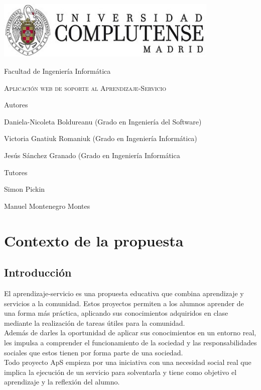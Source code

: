 \documentclass{article}
\begin{document}
\begin{titlepage}
	\centering
	{\includegraphics[width=0.8\textwidth]{logo}\par}
	\vspace{1cm}
	{\Large Facultad de Ingeniería Informática \par}
	\vspace{3cm}
	{\scshape\Huge Aplicación web de soporte al Aprendizaje-Servicio \par}
	\vspace{5cm}
	{\textbf\Large Autores \par}
	{\Large Daniela-Nicoleta Boldureanu (Grado en Ingeniería del Software)\par}
	{\Large Victoria Gnatiuk Romaniuk (Grado en Ingeniería Informática)\par}
	{\Large Jesús Sánchez Granado (Grado en Ingeniería Informática\par}
	\vspace{1cm}
	{\textbf\Large Tutores \par}
	{\Large Simon Pickin \par}
	{\Large Manuel Montenegro Montes \par}
	
\end{titlepage}

\tableofcontents
\newpage
\section{Contexto de la propuesta}
\subsection{Introducción}
El aprendizaje-servicio es una propuesta educativa que combina aprendizaje y servicios a la comunidad.  Estos proyectos permiten a los alumnos aprender de una forma más práctica, aplicando sus conocimientos adquiridos en clase mediante la realización de tareas útiles para la comunidad. \\
Además de darles la oportunidad de aplicar sus conocimientos en un entorno real, les impulsa a comprender el funcionamiento de la sociedad y las responsabilidades sociales que estos tienen por forma parte de una sociedad.\\
Todo proyecto ApS empieza por una iniciativa con una necesidad social real que implica la ejecución de un servicio para solventarla y tiene como objetivo el aprendizaje y la reflexión del alumno.\\
\end{document}
